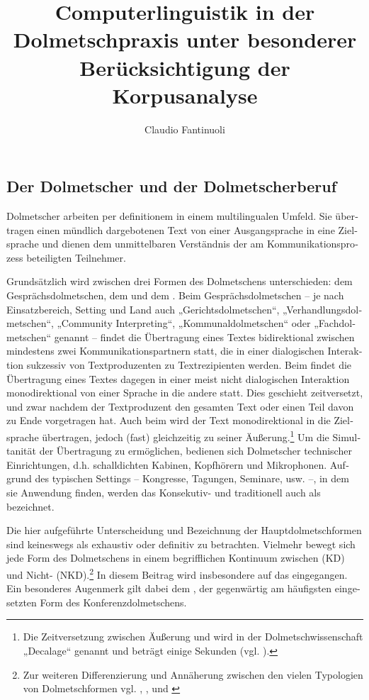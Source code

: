 \documentclass[output=paper]{LSP/langsci}
\author{Claudio Fantinuoli\affiliation{Johannes Gutenberg-Universität Mainz in Germersheim}}
\title{Computerlinguistik in der Dolmetschpraxis unter besonderer Berücksichtigung der Korpusanalyse}
\begin{document}
\begin{otherlanguage}{ngerman}



\section{Der Dolmetscher und der Dolmetscherberuf}\label{sec:fantinuoli:1}

Dolmetscher arbeiten per definitionem in einem multilingualen Umfeld. Sie übertragen einen mündlich dargebotenen Text von einer Ausgangsprache in eine Zielsprache und dienen dem unmittelbaren Verständnis der am Kommunikationsprozess beteiligten Teilnehmer.

Grundsätzlich wird zwischen drei Formen des Dolmetschens unterschieden: dem Gesprächsdolmetschen, dem  und dem . Beim Gesprächsdolmetschen -- je nach Einsatzbereich, Setting und Land auch „Gerichtsdolmetschen“, „Verhandlungsdolmetschen“, „Community Interpreting“, „Kommunaldolmetschen“ oder „Fachdolmetschen“ genannt -- findet die Übertragung eines Textes bidirektional zwischen mindestens zwei Kommunikationspartnern statt, die in einer dialogischen Interaktion sukzessiv von Textproduzenten zu Textrezipienten werden. Beim  findet die Übertragung eines Textes dagegen in einer meist nicht dialogischen Interaktion monodirektional von einer Sprache in die andere statt. Dies geschieht zeitversetzt, und zwar nachdem der Textproduzent den gesamten Text oder einen Teil davon zu Ende vorgetragen hat. Auch beim  wird der Text monodirektional in die Zielsprache übertragen, jedoch (fast) gleichzeitig zu seiner Äußerung.\footnote{Die Zeitversetzung zwischen Äußerung und  wird in der Dolmetschwissenschaft „Decalage“ genannt und beträgt einige Sekunden (vgl. \citealt{Pöchhacker2004}).} Um die Simultanität der Übertragung zu ermöglichen, bedienen sich Dolmetscher technischer Einrichtungen, d.h. schalldichten Kabinen, Kopfhörern und Mikrophonen. Aufgrund des typischen Settings -- Kongresse, Tagungen, Seminare, usw. --, in dem sie Anwendung finden, werden das Konsekutiv- und  traditionell auch als  bezeichnet. 

Die hier aufgeführte Unterscheidung und Bezeichnung der Hauptdolmetschformen sind keineswegs als exhaustiv oder definitiv zu betrachten. Vielmehr bewegt sich jede Form des Dolmetschens in einem begrifflichen Kontinuum zwischen  (KD) und Nicht- (NKD).\footnote{Zur weiteren Differenzierung und Annäherung zwischen den vielen Typologien von Dolmetschformen vgl. \citet[25ff]{Feldweg1996}, \citet[51]{Kalina2001}, \citet[33]{Pöchhacker2000} und \citet[354ff]{Gross-Dinter2009}} In diesem Beitrag wird insbesondere auf das  eingegangen. Ein besonderes Augenmerk gilt dabei dem , der gegenwärtig am häufigsten eingesetzten Form des Konferenzdolmetschens.


\end{otherlanguage}
\end{document}
